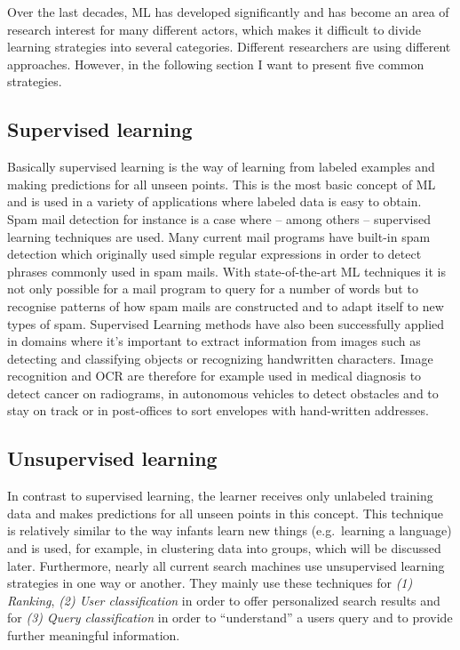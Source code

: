 \documentclass[conference]{IEEEtran}
\begin{document}
Over the last decades, ML has developed significantly and has become an area of
research interest for many different actors, which makes it difficult to divide learning 
strategies into several categories. Different researchers are using different 
approaches\cite{FoundationsOfML:mohri}\cite{Structure:corne}. 
However, in the following section I want to present five common strategies\cite{FoundationsOfML:mohri}.

\subsection{Supervised learning}
Basically supervised learning is the way of learning from labeled examples and making predictions 
for all unseen points. This is the most basic concept of ML and is used in a variety of applications 
where labeled data is easy to obtain. Spam mail detection for instance is a case where -- among 
others -- supervised learning techniques are used.
Many current mail programs have built-in spam detection which originally used
simple regular expressions in order to detect phrases commonly used in spam mails.
With state-of-the-art ML techniques it is not only possible for a mail program to 
query for a number of words but to recognise patterns of how spam mails are constructed and 
to adapt itself to new types of spam.
Supervised Learning methods have also been successfully applied in domains where it's 
important to extract information from images such as detecting and classifying 
objects or recognizing handwritten characters. Image 
recognition and OCR are therefore for example used in medical diagnosis to 
detect cancer on radiograms, in autonomous vehicles to detect obstacles and to 
stay on track or in post-offices to sort envelopes with hand-written 
addresses\cite{DisciplineOfML:mitchell}. 

\subsection{Unsupervised learning}
In contrast to supervised learning, the learner receives only 
unlabeled training data and makes predictions for all unseen points in this concept. This technique is 
relatively similar to the way infants learn new things (e.g.\ learning a language) and 
is used, for example, in clustering data into groups, which will be discussed later\cite{BrainInf:holzinger}.
Furthermore, nearly all current search machines use unsupervised learning strategies in one way or another. 
They mainly use these techniques for \textit{(1) Ranking}, \textit{(2) User classification}\cite{DisciplineOfML:mitchell} 
in order to offer personalized search results and for \textit{(3) Query classification} in order to ``understand'' a 
users query and to provide further meaningful information. 
\end{document}
